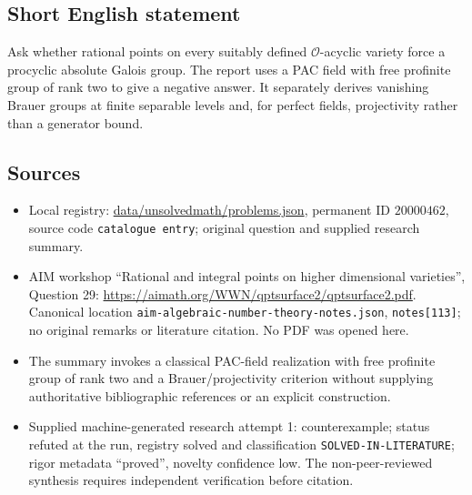 \documentclass[11pt]{article}
\begin{document}
\subsection{Short English statement}
Ask whether rational points on every suitably defined $\mathcal O$-acyclic variety force a procyclic absolute Galois group. The report uses a PAC field with free profinite group of rank two to give a negative answer. It separately derives vanishing Brauer groups at finite separable levels and, for perfect fields, projectivity rather than a generator bound.
\subsection{Sources}
\begin{itemize}
\item Local registry: \url{data/unsolvedmath/problems.json}, permanent ID $20000462$, source code \texttt{catalogue entry}; original question and supplied research summary.
\item AIM workshop ``Rational and integral points on higher dimensional varieties'', Question 29: \url{https://aimath.org/WWN/qptsurface2/qptsurface2.pdf}. Canonical location \texttt{aim-algebraic-number-theory-notes.json}, \texttt{notes[113]}; no original remarks or literature citation. No PDF was opened here.
\item The summary invokes a classical PAC-field realization with free profinite group of rank two and a Brauer/projectivity criterion without supplying authoritative bibliographic references or an explicit construction.
\item Supplied machine-generated research attempt 1: counterexample; status refuted at the run, registry solved and classification \texttt{SOLVED-IN-LITERATURE}; rigor metadata ``proved'', novelty confidence low. The non-peer-reviewed synthesis requires independent verification before citation.
\end{itemize}
\end{document}
